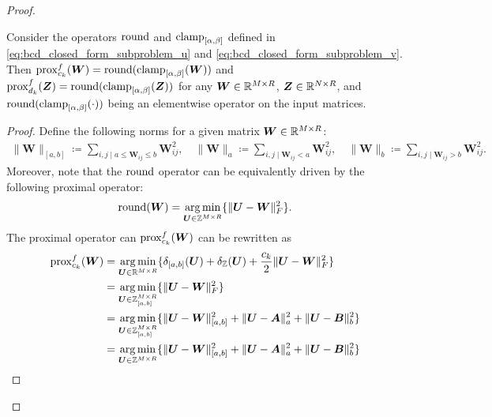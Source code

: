 \begin{proof}
    \begin{lem}
        Consider the operators $\operatorname{round}$ and $\operatorname{clamp}_{[\alpha,\beta]}$ defined in \eqref{eq:bcd_closed_form_subproblem_u} and \eqref{eq:bcd_closed_form_subproblem_v}.
        Then $\operatorname{prox}^f_{c_k}(\bm W) = \operatorname{round}(\operatorname{clamp}_{[\alpha,\beta]}(\bm W))$ and $\operatorname{prox}^f_{d_k}(\bm Z) = \operatorname{round}(\operatorname{clamp}_{[\alpha,\beta]}(\bm Z))$ for any $\bm W\in \mathbb{R}^{M\times R}$, $\bm Z\in\mathbb{R}^{N\times R}$, and $\operatorname{round}(\operatorname{clamp}_{[\alpha,\beta]}(\cdot))$ being an elementwise operator on the input matrices.
    \end{lem}
    \begin{proof}
        Define the following norms for a given matrix $\bm W \in \mathbb{R}^{M\times R}$:
        \begin{align*}
            \|\bm W\|_{[a,b]} \coloneqq \sum_{i,j \mid a \leq \bm W_{ij} \leq b} \bm W_{ij}^2, \quad 
            \|\bm W\|_a \coloneqq \sum_{i,j \mid \bm W_{ij} < a} \bm W_{ij}^2, \quad 
            \|\bm W\|_b \coloneqq \sum_{i,j \mid \bm W_{ij} > b} \bm W_{ij}^2.
        \end{align*}
        Moreover, note that the $\operatorname{round}$ operator  can be equivalently driven by the following proximal operator:
        \begin{equation}
            \operatorname{round}(\bm W) = \operatorname*{arg\,min}_{\bm U \in \mathbb Z^{M\times R}}\{\|\bm U - \bm W\|^2_F\}.
            \label{eq:equivalence_prox_Tz}
        \end{equation}
        The proximal operator can $\operatorname{prox}^f_{c_k}(\bm W)$ can be rewritten as
        \begin{align*}
            \prox^f_{c_k}(\bm W) &= \argmin_{\bm U \in \R^{M\times R}}\{\delta_{[a,b]}(\bm U) + \delta_{\Z}(\bm U) + \frac{c_k}{2} \|\bm U - \bm W\|^2_F\}\\
            &= \argmin_{\bm U \in \Z_{[a,b]}^{M\times R}}\{\|\bm U - \bm W\|^2_F\}\\
            &= \argmin_{\bm U \in \Z_{[a,b]}^{M\times R}}\{\|\bm U - \bm W\|^2_{[a,b]} + \|\bm U - \bm A\|^2_a + \|\bm U - \bm B\|^2_b\}\\
            &= \argmin_{\bm U \in \Z^{M\times R}}\{\|\bm U - \bm W\|^2_{[a,b]} + \|\bm U - \bm A\|^2_a + \|\bm U - \bm B\|^2_b\}\\

\end{align*}
\end{proof}
\end{proof}
